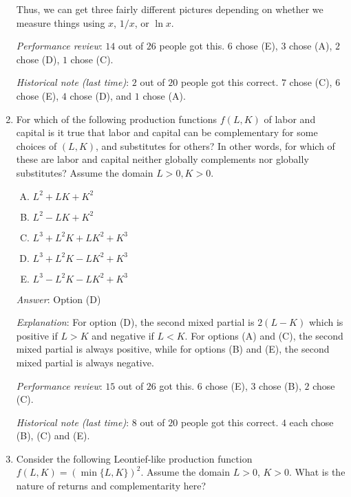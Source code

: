 \documentclass[10pt]{amsart}
\begin{document}
\begin{enumerate}
  Thus, we can get three fairly different pictures depending on
  whether we measure things using $x$, $1/x$, or $\ln x$.

  {\em Performance review}: $14$ out of $26$ people got this. $6$
  chose (E), $3$ chose (A), $2$ chose (D), $1$ chose (C).

  {\em Historical note (last time)}: $2$ out of $20$ people got this
  correct. $7$ chose (C), $6$ chose (E), $4$ chose (D), and $1$ chose
  (A).

\item For which of the following production functions $f(L,K)$ of
  labor and capital is it true that labor and capital can be
  complementary for some choices of $(L,K)$, and substitutes for
  others? In other words, for which of these are labor and capital
  neither globally complements nor globally substitutes? Assume the
  domain $L > 0, K > 0$.

  \begin{enumerate}[(A)]
  \item $L^2 + LK + K^2$
  \item $L^2 - LK + K^2$
  \item $L^3 + L^2K + LK^2 + K^3$
  \item $L^3 + L^2K - LK^2 + K^3$
  \item $L^3 - L^2K - LK^2 + K^3$
  \end{enumerate}

  {\em Answer}: Option (D)

  {\em Explanation}: For option (D), the second mixed partial is $2(L
  - K)$ which is positive if $L > K$ and negative if $L < K$. For
  options (A) and (C), the second mixed partial is always positive,
  while for options (B) and (E), the second mixed partial is always
  negative.

  {\em Performance review}: $15$ out of $26$ got this. $6$ chose (E),
  $3$ chose (B), $2$ chose (C).

  {\em Historical note (last time)}: $8$ out of $20$ people got this
  correct. $4$ each chose (B), (C) and (E).


\item Consider the following Leontief-like production function $f(L,K)
  = (\min \{ L, K \})^2$. Assume the domain $L > 0$, $K > 0$. What is
  the nature of returns and complementarity here?


\end{enumerate}
\end{document}
